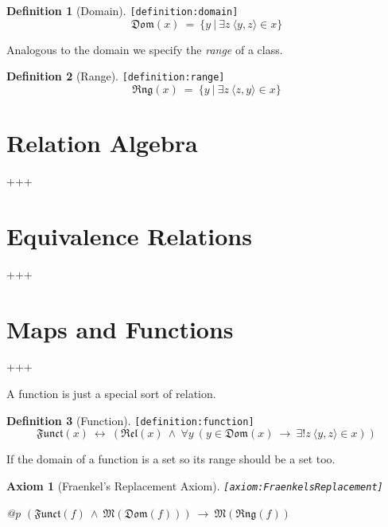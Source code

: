 \documentclass[a4paper,german,10pt,twoside]{book}
\newtheorem{ax}{Axiom}
\theoremstyle{definition}
\newtheorem{defn}{Definition}
\theoremstyle{remark}
\begin{document}
\begin{defn}[Domain]
\label{definition:domain} \hypertarget{definition:domain}{}
{\tt \tiny [\verb]definition:domain]]}
$$\mathfrak{Dom}(x) \ = \ \{ y \ | \ \exists z\ \langle y, z \rangle \in x \} $$
\end{defn}


\par
Analogous to the domain we specify the \emph{range} of a class.

\begin{defn}[Range]
\label{definition:range} \hypertarget{definition:range}{}
{\tt \tiny [\verb]definition:range]]}
$$\mathfrak{Rng}(x) \ = \ \{ y \ | \ \exists z\ \langle z, y \rangle \in x \} $$
\end{defn}


\section{Relation Algebra} \label{chapter5_section5} \hypertarget{chapter5_section5}{}
+++

\section{Equivalence Relations} \label{chapter5_section6} \hypertarget{chapter5_section6}{}
+++

\section{Maps and Functions} \label{chapter5_section7} \hypertarget{chapter5_section7}{}
+++

\par
A function is just a special sort of relation.

\begin{defn}[Function]
\label{definition:function} \hypertarget{definition:function}{}
{\tt \tiny [\verb]definition:function]]}
$$\mathfrak{Funct}(x)\ \leftrightarrow\ (\mathfrak{Rel}(x)\ \land\ \forall y\ (y \in \mathfrak{Dom}(x)\ \rightarrow\ \exists! z\ \langle y, z \rangle \in x))$$

\end{defn}


\par
If the domain of a function is a set so its range should be a set too.

\begin{ax}[Fraenkel's Replacement Axiom]
\label{axiom:FraenkelsReplacement} \hypertarget{axiom:FraenkelsReplacement}{}
{\tt \tiny [\verb]axiom:FraenkelsReplacement]]}
\mbox{}
\begin{longtable}{{@{\extracolsep{\fill}}p{\linewidth}}}
\centering $(\mathfrak{Funct}(f)\ \land\ \mathfrak{M}(\mathfrak{Dom}(f)))\ \rightarrow\ \mathfrak{M}(\mathfrak{Rng}(f))$
\end{longtable}

\end{ax}
\end{document}
